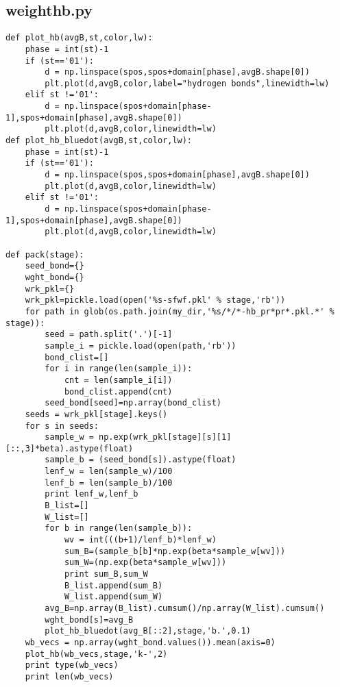 \documentclass[11pt]{article}
\begin{document}
\subsection{weighthb.py}
\begin{verbatim}
def plot_hb(avgB,st,color,lw):
    phase = int(st)-1
    if (st=='01'):
        d = np.linspace(spos,spos+domain[phase],avgB.shape[0])
        plt.plot(d,avgB,color,label="hydrogen bonds",linewidth=lw)
    elif st !='01':
        d = np.linspace(spos+domain[phase-1],spos+domain[phase],avgB.shape[0])
        plt.plot(d,avgB,color,linewidth=lw)
def plot_hb_bluedot(avgB,st,color,lw):
    phase = int(st)-1
    if (st=='01'):
        d = np.linspace(spos,spos+domain[phase],avgB.shape[0])
        plt.plot(d,avgB,color,linewidth=lw)
    elif st !='01':
        d = np.linspace(spos+domain[phase-1],spos+domain[phase],avgB.shape[0])
        plt.plot(d,avgB,color,linewidth=lw)

def pack(stage):
    seed_bond={}
    wght_bond={}
    wrk_pkl={}
    wrk_pkl=pickle.load(open('%s-sfwf.pkl' % stage,'rb'))
    for path in glob(os.path.join(my_dir,'%s/*/*-hb_pr*pr*.pkl.*' % stage)):
        seed = path.split('.')[-1]
        sample_i = pickle.load(open(path,'rb'))
        bond_clist=[]
        for i in range(len(sample_i)):
            cnt = len(sample_i[i])
            bond_clist.append(cnt)
        seed_bond[seed]=np.array(bond_clist)
    seeds = wrk_pkl[stage].keys()
    for s in seeds:
        sample_w = np.exp(wrk_pkl[stage][s][1][::,3]*beta).astype(float)
        sample_b = (seed_bond[s]).astype(float)
        lenf_w = len(sample_w)/100
        lenf_b = len(sample_b)/100
        print lenf_w,lenf_b
        B_list=[]
        W_list=[]
        for b in range(len(sample_b)):
            wv = int(((b+1)/lenf_b)*lenf_w)
            sum_B=(sample_b[b]*np.exp(beta*sample_w[wv]))
            sum_W=(np.exp(beta*sample_w[wv]))
            print sum_B,sum_W
            B_list.append(sum_B)
            W_list.append(sum_W)
        avg_B=np.array(B_list).cumsum()/np.array(W_list).cumsum()
        wght_bond[s]=avg_B
        plot_hb_bluedot(avg_B[::2],stage,'b.',0.1)
    wb_vecs = np.array(wght_bond.values()).mean(axis=0)
    plot_hb(wb_vecs,stage,'k-',2)
    print type(wb_vecs)
    print len(wb_vecs)
\end{verbatim}


\end{document}
